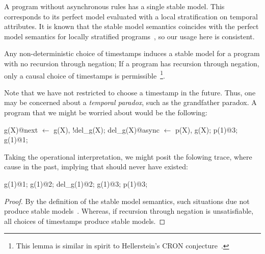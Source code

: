 A \lang program without asynchronous rules has a single stable model.  This corresponds to its perfect model evaluated with a local stratification on temporal attributes.  It is known that the stable model semantics coincides with the perfect model semantics for locally stratified programs~\cite{stable-model}, so our usage here is consistent.


\begin{lemma}
Any non-deterministic choice of timestamps induces a stable model for a \lang program with no recursion through negation; If a \lang program has recursion through negation, only a causal choice of timestamps is permissible~\footnote{This lemma is similar in spirit to Hellerstein's CRON conjecture~\cite{declarative-imperative}.}.
\end{lemma}

Note that we have not restricted  to choose a timestamp in the future.  Thus, one may be concerned about a {\em temporal paradox}, such as the grandfather paradox.  A program that we might be worried about would be the following:

\begin{Dedalus}
g(X)@next \(\leftarrow\) g(X), !del_g(X);
del_g(X)@async \(\leftarrow\) p(X), g(X);
p(1)@3;
g(1)@1;
\end{Dedalus}

Taking the operational interpretation, we might posit the folowing trace, where  cause  in the past, implying that  should never have existed:

\begin{Dedalus}
g(1)@1;
g(1)@2;
del_g(1)@2;
g(1)@3;
p(1)@3;
\end{Dedalus}

\begin{proof}
By the definition of the stable model semantics, such situations due not produce stable models~\cite{stable-model}.  Whereas, if recursion through negation is unsatisfiable, all choices of timestamps produce stable models.
\end{proof}

